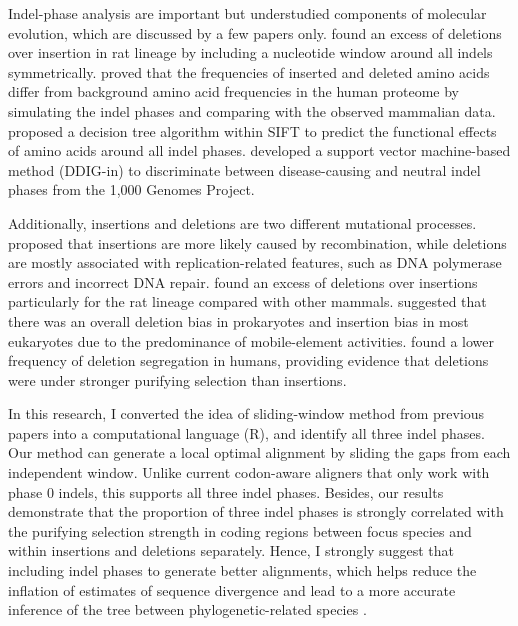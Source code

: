 Indel-phase analysis are important but understudied components of molecular evolution, which are discussed by a few papers only. \cite{taylor2004occurrence} found an excess of deletions over insertion in rat lineage by including a nucleotide window around all indels symmetrically. \cite{de2007dna} proved that the frequencies of inserted and deleted amino acids differ from background amino acid frequencies in the human proteome by simulating the indel phases and comparing with the observed mammalian data. \cite{hu2013sift} proposed a decision tree algorithm within SIFT to predict the functional effects of amino acids around all indel phases. \cite{zhao2013ddig} developed a support vector machine-based method (DDIG-in) to discriminate between disease-causing and neutral indel phases from the 1,000 Genomes Project. 

Additionally, insertions and deletions are two different mutational processes.  \cite{kvikstad2007macaque} proposed that insertions are more likely caused by recombination, while deletions are mostly associated with replication-related features, such as DNA polymerase errors and incorrect DNA repair. \cite{taylor2004occurrence} found an excess of deletions over insertions particularly for the rat lineage compared with other mammals. \cite{lynch2007origins} suggested that there was an overall deletion bias in prokaryotes and insertion bias in most eukaryotes due to the predominance of mobile-element activities. \cite{sjodin2010insertion} found a lower frequency of deletion segregation in humans, providing evidence that deletions were under stronger purifying selection than insertions.   

In this research, I converted the idea of sliding-window method from previous papers into a computational language (R), and identify all three indel phases. Our method can generate a local optimal alignment by sliding the gaps from each independent window. Unlike current codon-aware aligners that only work with phase 0 indels, this supports all three indel phases. Besides, our results demonstrate that the proportion of three indel phases is strongly correlated with the purifying selection strength in coding regions between focus species and within insertions and deletions separately. Hence, I strongly suggest that including indel phases to generate better alignments, which helps reduce the inflation of estimates of sequence divergence and lead to a more accurate inference of the tree between phylogenetic-related species \parencite{kapli2020phylogenetic}. 

